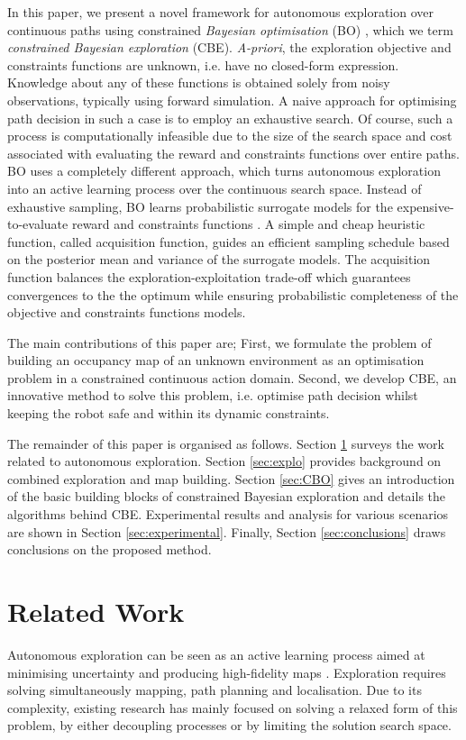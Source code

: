 \documentclass[shortAfour,sageh,times]{sagej_no_sage}
\begin{document}
In this paper, we present a novel framework for autonomous exploration over continuous paths using constrained \textit{Bayesian optimisation} (BO) \citep{Gelbart2014}, which we term \textit{constrained Bayesian exploration} (CBE). 
\textit{A-priori}, the exploration objective and constraints functions are unknown, i.e. have no closed-form expression. Knowledge about any of these functions is obtained solely from noisy observations, typically using forward simulation. A naive approach for optimising path decision in such a case is to employ an exhaustive search. Of course, such a process is computationally infeasible due to the size of the search space and cost associated with evaluating the reward and constraints functions over entire paths. BO uses a completely different approach, which turns autonomous exploration into an active learning process over the continuous search space. Instead of exhaustive sampling, BO learns probabilistic surrogate models for the expensive-to-evaluate reward and constraints functions \citep{Brochu2010}. A simple and cheap heuristic function, called acquisition function, guides an efficient sampling schedule based on the posterior mean and variance of the surrogate models. The acquisition function balances the exploration-exploitation trade-off which guarantees convergences to the the optimum while ensuring probabilistic completeness of the objective and constraints functions models.
   
The main contributions of this paper are; First, we formulate the problem of building an occupancy map of an unknown environment 
as an optimisation problem in a constrained continuous action domain. Second, we develop CBE, an innovative method to solve this problem, i.e. optimise path decision whilst keeping the robot safe and within its dynamic constraints.

The remainder of this paper is organised as follows. Section \ref{sec:RelatedWork} surveys the work related to autonomous exploration. Section \ref{sec:explo} provides background on combined exploration and map building. Section \ref{sec:CBO} gives an introduction of the basic building blocks of constrained Bayesian exploration and details the algorithms behind CBE. Experimental results and analysis for various scenarios are shown in Section \ref{sec:experimental}. Finally, Section \ref{sec:conclusions} draws conclusions on the proposed method.

\section{Related Work}
\label{sec:RelatedWork}
Autonomous exploration can be seen as an active learning process aimed at minimising uncertainty and producing 
high-fidelity maps \citep{Makarenko2002,Stachniss2009}. Exploration requires solving simultaneously mapping, path planning and localisation. Due to its complexity, existing research has mainly focused on solving a relaxed form of this problem, by either decoupling processes or by limiting the solution search space.
 
\end{document}
